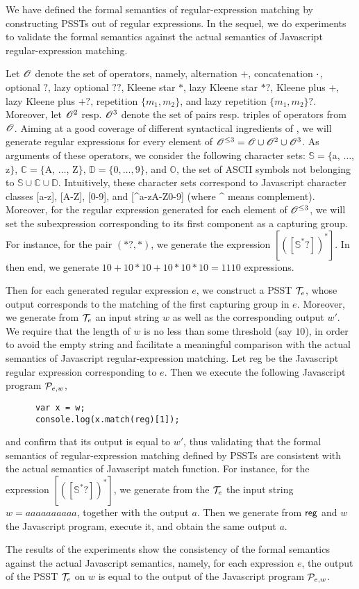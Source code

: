 
We have defined the formal semantics of regular-expression matching by constructing PSSTs out of regular expressions. 
In the sequel, we do experiments to validate the formal semantics against the actual semantics of Javascript regular-expression matching.

Let $\mathscr{O}$ denote the set of {\regexp} operators, namely, alternation $+$, concatenation $\cdot$, optional $?$, lazy optional $??$, Kleene star $*$, lazy Kleene star $*?$, Kleene plus $+$, lazy Kleene plus $+?$, repetition $\{m_1,m_2\}$, and lazy repetition $\{m_1,m_2\}?$. Moreover, let $\mathscr{O}^{2}$ resp. $\mathscr{O}^{3}$ denote the set of pairs resp. triples of operators from $\mathscr{O}$. 
Aiming at a good coverage of different syntactical ingredients of {\regexp}, we will generate regular expressions for every element of $\mathscr{O}^{\le 3} = \mathscr{O} \cup \mathscr{O}^2 \cup \mathscr{O}^3$.
As arguments of these operators, we consider the following character sets: $\mathbb{S} = \{$a, $\ldots$, z$\}$, $\mathbb{C}=\{$A, $\ldots$, Z$\}$, $\mathbb{D} = \{0,\ldots,9\}$, and $\mathbb{O}$, the set of ASCII symbols not belonging to $\mathbb{S} \cup \mathbb{C} \cup \mathbb{D}$.
Intuitively, these character sets correspond to Javascript character classes [a-z], [A-Z], [0-9], and [{\textasciicircum}a-zA-Z0-9] (where {\textasciicircum} means complement).
Moreover, for the regular expression generated for each element of $\mathscr{O}^{\le 3}$, we will set the subexpression corresponding to its first component as a capturing group. 
For instance, for the pair $(*?, *)$, we generate the {\regexp} expression $[([\mathbb{S}^*?])^{*}]$. In then end, we generate $10+10*10+10*10*10 = 1110$ {\regexp} expressions. 

Then for each generated regular expression $e$, we construct a PSST $\mathcal{T}_e$, whose output corresponds to the matching of the first capturing group in $e$.  Moreover, we generate from $\mathcal{T}_e$ an input string $w$ as well as the corresponding output $w'$. We require that the length of $w$ is no less than some threshold (say $10$), in order to avoid the empty string and facilitate a  meaningful comparison with the actual semantics of Javascript regular-expression matching. 
Let {\sf reg} be the Javascript regular expression corresponding to $e$. Then we execute the following Javascript program $\mathcal{P}_{e,w}$,
\begin{center}
{
\small
\begin{verbatim}
      var x = w; 
      console.log(x.match(reg)[1]);
\end{verbatim}
}
\end{center}
and confirm that its output is equal to $w'$, thus validating that the formal semantics of  regular-expression matching defined by PSSTs are consistent with the actual semantics of Javascript {\sf match} function. For instance, for the {\regexp} expression $[([\mathbb{S}^*?])^{*}]$, we generate from the $\mathcal{T}_e$ the input string $w= aaaaaaaaaa$, together with the output $a$. Then we generate from ${\sf reg}$ and $w$ the Javascript program, execute it, and obtain the same output $a$.

The results of the experiments show the consistency of the formal semantics against the actual Javascript semantics, namely, for each {\regexp} expression $e$, the output of the PSST $\mathcal{T}_e$ on $w$ is equal to the output of the Javascript program $\mathcal{P}_{e,w}$.